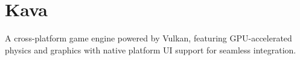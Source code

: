 \chapter{Kava}
\hypertarget{index}{}\label{index}
\label{index_md__r_e_a_d_m_e}%
%


A cross-\/platform game engine powered by Vulkan, featuring GPU-\/accelerated physics and graphics with native platform UI support for seamless integration. 